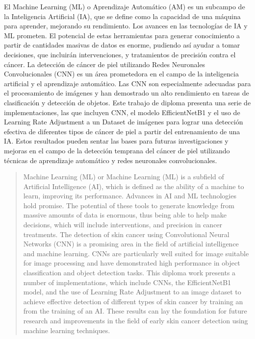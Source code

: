 \begin{resumen}
	El Machine Learning (ML) o Aprendizaje Automático (AM) es un subcampo de la Inteligencia Artificial (IA),
que se define como la capacidad de una máquina para aprender, mejorando su rendimiento. Los avances en
las tecnologías de IA y ML prometen. El potencial de estas herramientas para generar conocimiento a partir de cantidades masivas
de datos es enorme, pudiendo así ayudar a tomar decisiones, que incluirán intervenciones, y tratamientos
de precisión contra el cáncer. La detección de cáncer de piel utilizando Redes Neuronales Convolucionales (CNN) 
es un área prometedora en el campo de la inteligencia artificial y el aprendizaje automático. Las CNN son especialmente
adecuadas para el procesamiento de imágenes y han demostrado un alto rendimiento en tareas de clasificación y detección
de objetos. Este trabajo de diploma presenta una serie de implementaciones, las que incluyen CNN, el modelo EfficientNetB1 
y el uso de Learning Rate Adjustment a un Dataset de imágenes para lograr una detección efectiva de diferentes tipos de cáncer 
de piel a partir del entrenamiento de una IA. Estos resultados pueden sentar las bases para futuras investigaciones y mejoras 
en el campo de la detección temprana del cáncer de piel utilizando técnicas de aprendizaje automático y 
redes neuronales convolucionales.
\end{resumen}

\begin{abstract}
	Machine Learning (ML) or Machine Learning (ML) is a subfield of Artificial Intelligence (AI), which is defined 
as the ability of a machine to learn, improving its performance. Advances in AI and ML technologies hold promise. 
The potential of these tools to generate knowledge from massive amounts of data is enormous, thus being able to help 
make decisions, which will include interventions, and precision in cancer treatments. The detection of skin cancer using 
Convolutional Neural Networks (CNN)  is a promising area in the field of artificial intelligence and machine learning. 
CNNs are particularly well suited for image suitable for image processing and have demonstrated high performance in object 
classification and object detection tasks. This diploma work presents a number of implementations, which 
include CNNs, the EfficientNetB1 model, and the use of Learning Rate Adjustment to an image dataset to achieve 
effective detection of different types of skin cancer by training an from the training of an AI. These results can lay 
the foundation for future research and improvements in the field of early skin cancer detection using machine learning 
techniques.
\end{abstract}